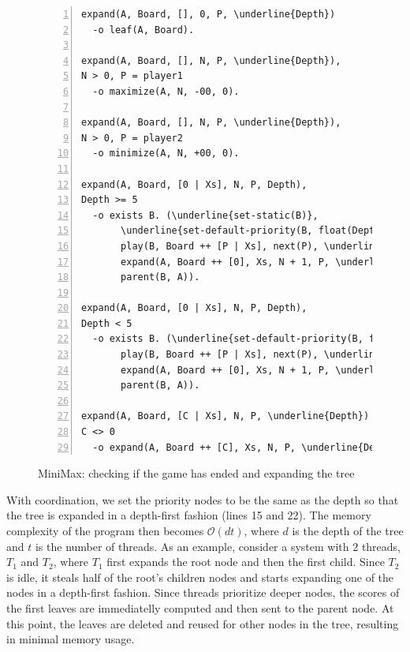 \begin{figure}[h!]
\scriptsize\begin{Verbatim}[numbers=left,commandchars=\\\{\}]
expand(A, Board, [], 0, P, \underline{Depth})
  -o leaf(A, Board).

expand(A, Board, [], N, P, \underline{Depth}),
N > 0, P = player1
  -o maximize(A, N, -00, 0).

expand(A, Board, [], N, P, \underline{Depth}),
N > 0, P = player2
  -o minimize(A, N, +00, 0).

expand(A, Board, [0 | Xs], N, P, Depth),
Depth >= 5
  -o exists B. (\underline{set-static(B)},
       \underline{set-default-priority(B, float(Depth + 1))},
       play(B, Board ++ [P | Xs], next(P), \underline{Depth + 1}),
       expand(A, Board ++ [0], Xs, N + 1, P, \underline{Depth}),
       parent(B, A)).

expand(A, Board, [0 | Xs], N, P, Depth),
Depth < 5
  -o exists B. (\underline{set-default-priority(B, float(Depth + 1))},
       play(B, Board ++ [P | Xs], next(P), \underline{Depth + 1}),
       expand(A, Board ++ [0], Xs, N + 1, P, \underline{Depth}),
       parent(B, A)).

expand(A, Board, [C | Xs], N, P, \underline{Depth})
C <> 0
  -o expand(A, Board ++ [C], Xs, N, P, \underline{Depth}).
\end{Verbatim}
\caption{MiniMax: checking if the game has ended and expanding the tree}
\label{minimax:check-end}
\end{figure}
\normalsize

With coordination, we set the priority nodes to be the same as the
depth so that the tree is expanded in a depth-first fashion (lines 15 and 22).
The memory complexity of the program then becomes $\mathcal{O}(d t)$, where $d$
is the depth of the tree and $t$ is the number of threads. As an example,
consider a system with 2 threads, $T_1$ and $T_2$, where $T_1$ first expands the root
node and then the first child. Since $T_2$ is idle, it steals half of the root's
children nodes and starts expanding one of the nodes in a depth-first fashion.
Since threads prioritize deeper nodes, the scores of the first leaves are immediatelly
computed and then sent to the parent node. At this point, the leaves are deleted
and reused for other nodes in the tree, resulting in minimal memory usage.

